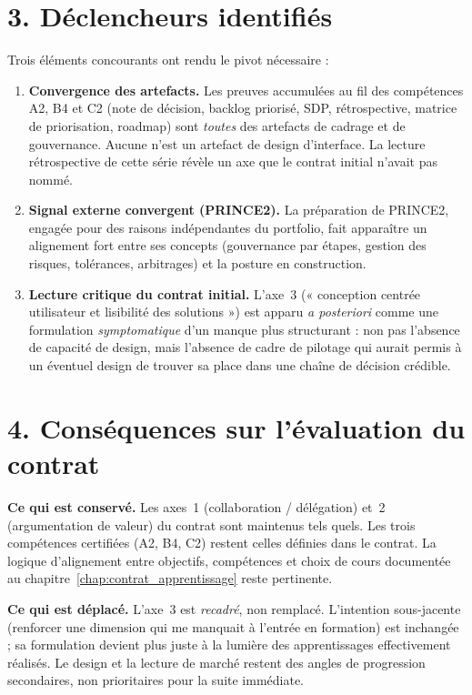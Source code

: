 \section*{3. Déclencheurs identifiés}

Trois éléments concourants ont rendu le pivot nécessaire :

\begin{enumerate}
  \item \textbf{Convergence des artefacts.} Les preuves accumulées au fil des compétences A2, B4 et C2 (note de décision, backlog priorisé, SDP, rétrospective, matrice de priorisation, roadmap) sont \emph{toutes} des artefacts de cadrage et de gouvernance. Aucune n'est un artefact de design d'interface. La lecture rétrospective de cette série révèle un axe que le contrat initial n'avait pas nommé.
  \item \textbf{Signal externe convergent (PRINCE2).} La préparation de PRINCE2, engagée pour des raisons indépendantes du portfolio, fait apparaître un alignement fort entre ses concepts (gouvernance par étapes, gestion des risques, tolérances, arbitrages) et la posture en construction.
  \item \textbf{Lecture critique du contrat initial.} L'axe~3 (« conception centrée utilisateur et lisibilité des solutions ») est apparu \emph{a posteriori} comme une formulation \emph{symptomatique} d'un manque plus structurant : non pas l'absence de capacité de design, mais l'absence de cadre de pilotage qui aurait permis à un éventuel design de trouver sa place dans une chaîne de décision crédible.
\end{enumerate}

\section*{4. Conséquences sur l'évaluation du contrat}

\textbf{Ce qui est conservé.} Les axes~1 (collaboration / délégation) et~2 (argumentation de valeur) du contrat sont maintenus tels quels. Les trois compétences certifiées (A2, B4, C2) restent celles définies dans le contrat. La logique d'alignement entre objectifs, compétences et choix de cours documentée au chapitre~\ref{chap:contrat_apprentissage} reste pertinente.

\textbf{Ce qui est déplacé.} L'axe~3 est \emph{recadré}, non remplacé. L'intention sous-jacente (renforcer une dimension qui me manquait à l'entrée en formation) est inchangée ; sa formulation devient plus juste à la lumière des apprentissages effectivement réalisés. Le design et la lecture de marché restent des angles de progression secondaires, non prioritaires pour la suite immédiate.

